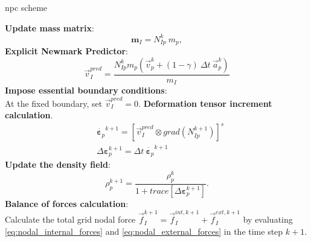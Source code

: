 \documentclass[preprint,12pt,a4paper]{elsarticle}
\newcommand{\tens}[1]{
  \ensuremath{\mathbf{{#1}}}
}
\newcommand\Grad[1]{grad({#1})}
\begin{document}
\begin{algorithm}
  \renewcommand{\thealgorithm}{}
  \caption{\acrfull{npc} scheme} \label{algo:1}
  \begin{algorithmic}[1]
    \STATE \textbf{Update mass matrix}:
    \begin{equation*}
      \tens{m}_{I} = N_{Ip}^{k}\ m_p,
    \end{equation*}
    \STATE \textbf{Explicit Newmark Predictor}:\\
    \begin{equation*}
      \vec{v}_I^{pred} = \frac{ N_{Ip}^{k} m_p (\vec{v}_p^k + (1 - \gamma)\ \Delta t\ \vec{a}_p^k)}{m_I}
    \end{equation*}
    \STATE \textbf{Impose essential boundary conditions}:\\
    At the fixed boundary, set $\vec{v}_{I}^{pred} = 0$. 
    \STATE \textbf{Deformation tensor increment calculation}.
    \begin{align*}
      &\dot{\tens{\varepsilon}_{p}}^{k+1} = \left[ \vec{v}_{I}^{pred} \otimes
        \Grad{N_{Ip}^{k+1}} \right]^s \\
      &\Delta \tens{\varepsilon}_{p}^{k+1} = \Delta t\ \dot{\tens{\varepsilon}_{p}}^{k+1}
    \end{align*}
    \STATE \textbf{Update the density field}:
    \begin{equation*}
      \rho_p^{k+1} = \frac{\rho_p^k}{1 + \mathit{trace}\left[\Delta\tens{\varepsilon}_{p}^{k+1}\right]}.
    \end{equation*}
    \STATE \textbf{Balance of forces calculation}:\\
    Calculate the total grid nodal force $\vec{f}_{I}^{k+1} =
    \vec{f}_{I}^{int,k+1} + \vec{f}_{I}^{ext,k+1}$ by evaluating
    \eqref{eq:nodal_internal_forces} and
    \eqref{eq:nodal_external_forces} in the time step $k+1$.

\end{algorithmic}
\end{algorithm}
\end{document}
